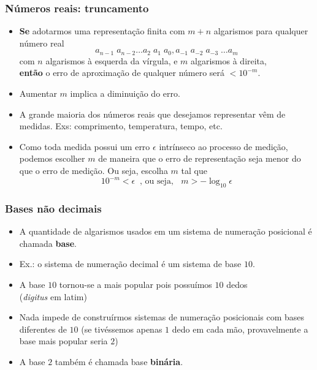 \documentclass{beamer}
\begin{document}
\begin{frame}
\frametitle{Números reais: truncamento}

\begin{itemize}
\item \textbf{Se} adotarmos uma representação finita com $m+n$ algarismos para qualquer número real
\[
a_{n-1} \; a_{n-2} \ldots a_2 \; a_1 \; a_0 , a_{-1} \; a_{-2} \; a_{-3} \; \ldots a_{m}
\]
com $n$ algarismos à esquerda da vírgula, e $m$ algarismos à direita,\\\textbf{então} o erro de aproximação de qualquer número será $< 10^{-m}$.

\pause

\item Aumentar $m$ implica a diminuição do erro.

\pause

\item A grande maioria dos números reais que desejamos representar vêm de medidas. Exs: comprimento, temperatura, tempo, etc.

\pause

\item Como toda medida possui um erro $\epsilon$ intrínseco ao processo de medição, podemos escolher $m$ de maneira que o erro de representação seja menor do que o erro de medição. Ou seja, escolha $m$ tal que
\[
10^{-m} < \epsilon \;\; \text{, ou seja, } \;\; m > -\log_{10} \epsilon
\]

\end{itemize}

\end{frame}

\begin{frame}
\frametitle{Bases não decimais}

\begin{itemize}
\item A quantidade de algarismos usados em um sistema de numeração posicional é chamada \textbf{base}.
\pause
\item Ex.: o sistema de numeração decimal é um sistema de base $10$.
\pause
\item A base $10$ tornou-se a mais popular pois possuímos $10$ dedos\\(\emph{digitus} em latim)
\pause
\item Nada impede de construírmos sistemas de numeração posicionais com bases diferentes de $10$ (se tivéssemos apenas $1$ dedo em cada mão, provavelmente a base mais popular seria $2$) 
\pause
\item A base $2$ também é chamada base \textbf{binária}.
\end{itemize}
\end{frame}
\end{document}
